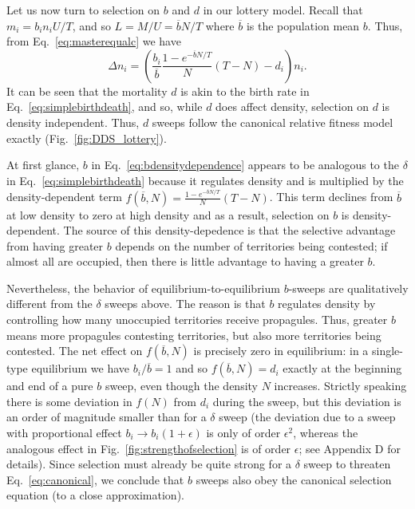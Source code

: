 \documentclass[12pt]{article}
\begin{document}
Let us now turn to selection on $b$ and $d$ in our lottery model. Recall that $m_i=b_i n_i U/T$, and so $L=M/U=\overline{b}N/T$ where $\overline{b}$ is the population mean $b$. Thus, from Eq.~\eqref{eq:masterequalc} we have
\begin{equation}
\Delta n_i = \left(\frac{b_i}{\overline{b}}\frac{1-e^{-\overline{b}N/T}}{N}(T-N)-d_i\right)n_i. \label{eq:bdensitydependence}
\end{equation}
It can be seen that the mortality $d$ is akin to the birth rate in Eq.~\eqref{eq:simplebirthdeath}, and so, while $d$ does affect density, selection on $d$ is density independent. Thus, $d$ sweeps follow the canonical relative fitness model exactly (Fig.~\ref{fig:DDS_lottery}).

At first glance, $b$ in Eq.~\eqref{eq:bdensitydependence} appears to be analogous to the $\delta$ in Eq.~\eqref{eq:simplebirthdeath} because it regulates density and is multiplied by the density-dependent term $f(\overline{b},N)=\frac{1-e^{-\overline{b}N/T}}{N}(T-N)$. This term declines from $\overline{b}$ at low density to zero at high density and as a result, selection on $b$ is density-dependent. The source of this density-depedence is that the selective advantage from having greater $b$ depends on the number of territories being contested; if almost all are occupied, then there is little advantage to having a greater $b$.

Nevertheless, the behavior of equilibrium-to-equilibrium $b$-sweeps are qualitatively different from the $\delta$ sweeps above. The reason is that $b$ regulates density by controlling how many unoccupied territories receive propagules. Thus, greater $b$ means more propagules contesting territories, but also more territories being contested. The net effect on $f(\overline{b},N)$ is precisely zero in equilibrium: in a single-type equilibrium we have $b_i/\overline{b}=1$ and so $f(\overline{b},N)=d_i$ exactly at the beginning and end of a pure $b$ sweep, even though the density $N$ increases. Strictly speaking there is some deviation in $f(N)$ from $d_i$ during the sweep, but this deviation is an order of magnitude smaller than for a $\delta$ sweep (the deviation due to a sweep with proportional effect $b_i\rightarrow b_i(1+\epsilon)$ is only of order $\epsilon^2$, whereas the analogous effect in Fig.~\ref{fig:strengthofselection} is of order $\epsilon$; see Appendix D for details). Since selection must already be quite strong for a $\delta$ sweep to threaten Eq.~\eqref{eq:canonical}, we conclude that $b$ sweeps also obey the canonical selection equation (to a close approximation). 
\end{document}
